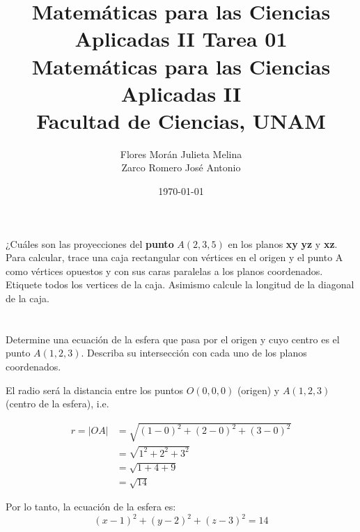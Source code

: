 \documentclass[12pt]{article}
\title{Matemáticas para las Ciencias Aplicadas II}
\title{
	\textbf{Tarea 01} \\
	\vspace{1ex}
	\large Matemáticas para las Ciencias Aplicadas II \\
	Facultad de Ciencias, UNAM}
\date{\today}
\author{Flores Morán Julieta Melina \\ Zarco Romero José Antonio}
\begin{document}
\maketitle

\section{}

¿Cuáles son las proyecciones del \textbf{punto} $A(2,3,5)$ en los planos \textbf{xy} \textbf{yz} y \textbf{xz}. Para calcular, trace una caja rectangular con vértices en el origen y el punto A como vértices opuestos y con sus caras paralelas a los planos coordenados. Etiquete todos los vertices de la caja. Asimismo calcule la longitud de la diagonal de la caja.

\section{}

Determine una ecuación de la esfera que pasa por el origen y cuyo centro es el punto $A(1,2,3)$. Describa su intersección con cada uno de los planos coordenados.

El radio será la distancia entre los puntos $O(0,0,0)$ (origen) y $A(1,2,3)$ (centro de la esfera), i.e.

\begin{align*}
  r = |OA|
  &= \sqrt{(1-0)^2 + (2-0)^2 + (3-0)^2} \\
  &= \sqrt{1^2 + 2^2 + 3^2} \\
  &= \sqrt{1 + 4 + 9} \\
  &= \sqrt{14}
\end{align*}

Por lo tanto, la ecuación de la esfera es: $$ (x-1)^2 + (y-2)^2 + (z-3)^2 = 14 $$
\end{document}
